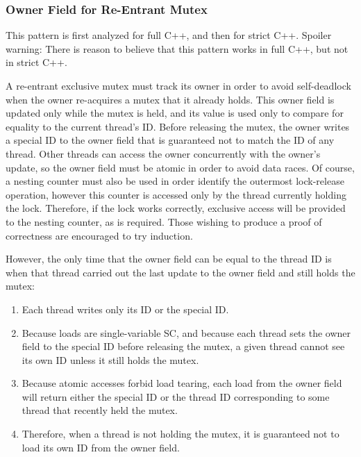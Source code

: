 \documentclass[10]{article}
\begin{document}
\subsubsection{Owner Field for Re-Entrant Mutex}
\label{sec:Owner Field for Re-Entrant Mutex}

This pattern is first analyzed for full C++, and then for strict C++.
Spoiler warning:  There is reason to believe that this pattern works
in full C++, but not in strict C++.

A re-entrant exclusive mutex must track its owner in order to avoid
self-deadlock when the owner re-acquires a mutex that it already holds.
This owner field is updated only while the mutex is held, and its value
is used only to compare for equality to the current thread's ID.
Before releasing the mutex, the owner writes a special ID to the owner
field that is guaranteed not to match the ID of any thread.
Other threads can access the owner concurrently with the owner's
update, so the owner field must be atomic in order to avoid data races.
Of course, a nesting counter must also be used in order identify the
outermost lock-release operation, however this counter is accessed only
by the thread currently holding the lock.
Therefore, if the lock works correctly, exclusive access will be provided
to the nesting counter, as is required.
Those wishing to produce a proof of correctness are encouraged to try
induction.

However, the only time that the owner field can be equal to the thread ID
is when that thread carried out the last update to the owner field and
still holds the mutex:

\begin{enumerate}
\item	Each thread writes only its ID or the special ID.
\item	Because  loads are single-variable
	SC, and because each thread sets the owner field to the special
	ID before releasing the mutex, a given thread cannot see its own
	ID unless it still holds the mutex.
\item	Because atomic accesses forbid load tearing, each load from
	the owner field will return either the special ID or the thread
	ID corresponding to some thread that recently held the mutex.
\item	Therefore, when a thread is not holding the mutex, it is guaranteed
	not to load its own ID from the owner field.
\end{enumerate}
\end{document}
